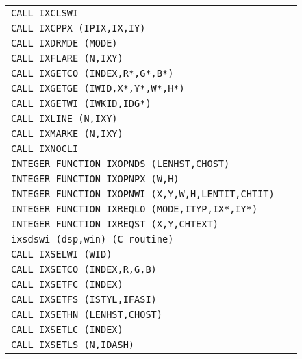 \begin{longtable}{|>{\small\tt}p{.92\linewidth}r|}
CALL IXCLSWI                                          & \pageref{IXCLSWI}\\
CALL IXCPPX (IPIX,IX,IY)                              & \pageref{IXCPPX} \\
CALL IXDRMDE (MODE)                                   & \pageref{IXDRMDE}\\
CALL IXFLARE (N,IXY)                                  & \pageref{IXFLARE}\\
CALL IXGETCO (INDEX,R*,G*,B*)                         & \pageref{IXGETCO}\\
CALL IXGETGE (IWID,X*,Y*,W*,H*)                       & \pageref{IXGETGE}\\
CALL IXGETWI (IWKID,IDG*)                             & \pageref{IXGETWI}\\
CALL IXLINE (N,IXY)                                   & \pageref{IXLINE} \\
CALL IXMARKE (N,IXY)                                  & \pageref{IXMARKE}\\
CALL IXNOCLI                                          & \pageref{IXNOCLI}\\
INTEGER FUNCTION IXOPNDS (LENHST,CHOST)               & \pageref{IXOPNDS}\\
INTEGER FUNCTION IXOPNPX (W,H)                        & \pageref{IXOPNPX}\\
INTEGER FUNCTION IXOPNWI (X,Y,W,H,LENTIT,CHTIT)       & \pageref{IXOPNWI}\\
INTEGER FUNCTION IXREQLO (MODE,ITYP,IX*,IY*)          & \pageref{IXREQLO}\\
INTEGER FUNCTION IXREQST (X,Y,CHTEXT)                 & \pageref{IXREQST}\\
ixsdswi (dsp,win) (C routine)                         & \pageref{ixsdswi}\\
CALL IXSELWI (WID)                                    & \pageref{IXSELWI}\\
CALL IXSETCO (INDEX,R,G,B)                            & \pageref{IXSETCO}\\
CALL IXSETFC (INDEX)                                  & \pageref{IXSETFC}\\
CALL IXSETFS (ISTYL,IFASI)                            & \pageref{IXSETFS}\\
CALL IXSETHN (LENHST,CHOST)                           & \pageref{IXSETHN}\\
CALL IXSETLC (INDEX)                                  & \pageref{IXSETLC}\\
CALL IXSETLS (N,IDASH)                                & \pageref{IXSETLS}\\

\end{longtable}

